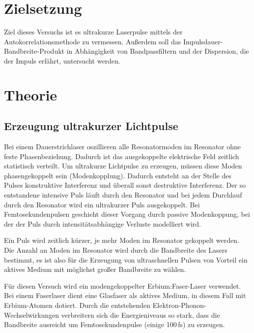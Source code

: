 \section{Zielsetzung}
Ziel dieses Versuchs ist es ultrakurze Laserpulse mittels der Autokorrelationsmethode zu vermessen.
Außerdem soll das Impulsdauer-Bandbreite-Produkt in Abhängigkeit von Bandpassfiltern und
der Dispersion, die der Impuls erfährt, untersucht werden.
\section{Theorie}
\subsection{Erzeugung ultrakurzer Lichtpulse}
Bei einem Dauerstrichlaser oszillieren alle Resonatormoden im Resonator ohne 
feste Phasenbeziehung. Dadurch ist das ausgekoppelte elektrische Feld zeitlich statistisch verteilt.
Um ultrakurze Lichtpulse zu erzeugen, müssen diese Moden phasengekoppelt sein (Modenkopplung).
Dadurch entsteht an der Stelle des Pulses konstruktive Interferenz und überall sonst destruktive Interferenz.
Der so entstandene intensive Puls läuft durch den Resonator und bei jedem Durchlauf durch den Resonator wird ein ultrakurzer Puls ausgekoppelt.
Bei Femtosekundenpulsen geschieht dieser Vorgang durch passive Modenkoppung, bei der der Puls durch intensitätsabhängige Verluste modelliert wird.

Ein Puls wird zeitlich kürzer, je mehr Moden im Resonator gekoppelt werden. Die Anzahl an Moden im Resonator wird durch die Bandbreite des Lasers bestimmt, es ist also für die Erzeugung
von ultraschnellen Pulsen von Vorteil ein aktives Medium mit möglichst großer Bandbreite zu wählen.

Für diesen Versuch wird ein modengekoppelter Erbium:Faser-Laser verwendet.
Bei einem Faserlaser dient eine Glasfaser als aktives Medium, in diesem Fall mit Erbium-Atomen dotiert.
Durch die entstehenden Elektron-Phonon-Wechselwirkungen verbreitern sich die Energieniveaus so stark, dass 
die Bandbreite ausreicht um Femtosekundenpulse (einige 100$\,$fs) zu erzeugen.


